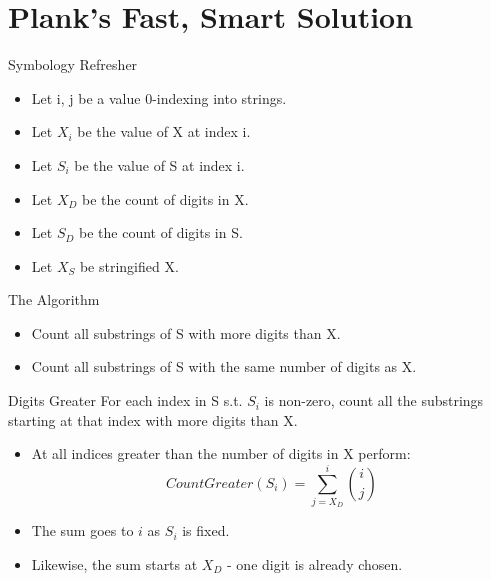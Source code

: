 \documentclass[10pt]{beamer}
\begin{document}
\section{Plank's Fast, Smart Solution}

\begin{frame}{Symbology Refresher}
  \Large
  \begin{itemize} %
    \item Let i, j be a value 0-indexing into strings.
    \item Let $X_{i}$ be the value of X at index i.
    \item Let $S_{i}$ be the value of S at index i.
    \item Let $X_{D}$ be the count of digits in X.
    \item Let $S_{D}$ be the count of digits in S.
    \item Let $X_{S}$ be stringified X.
  \end{itemize}
\end{frame}

\begin{frame}{The Algorithm}
  \huge
  \begin{itemize} %
    \item Count all substrings of S with more digits than X. \\
    \item Count all substrings of S with the same number of digits as X. \\
  \end{itemize}
\end{frame}

\begin{frame}{Digits Greater}
  \large
  For each index in S s.t. $S_{i}$ is non-zero, count all the substrings starting at that index with more digits than X.
  \begin{itemize} %
    \item At all indices greater than the number of digits in X perform:
      \begin{equation*}
        CountGreater(S_{i}) = \sum_{j = X_{D}}^{i} \binom{i}{j}
      \end{equation*}
    \item The sum goes to $i$ as $S_{i}$ is fixed.
    \item Likewise, the sum starts at $X_{D}$ \-- one digit is already chosen.
  \end{itemize}
\end{frame}
\end{document}
